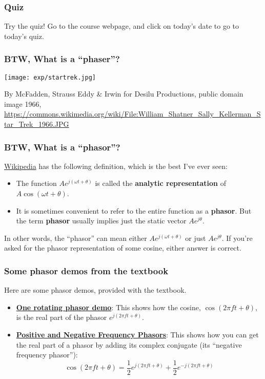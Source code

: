 \documentclass{beamer}
\begin{document}
\begin{frame}
  \frametitle{Quiz}

  Try the quiz!  Go to the course webpage, and click on today's date to go to
  today's quiz.
\end{frame}

\begin{frame}
  \frametitle{BTW, What is a ``phaser''?}
  \centerline{\texttt{[image: exp/startrek.jpg]}}
  \begin{tiny}
    By McFadden, Strauss Eddy \& Irwin for Desilu Productions, public domain image 1966,
    \url{https://commons.wikimedia.org/wiki/File:William_Shatner_Sally_Kellerman_Star_Trek_1966.JPG}
  \end{tiny}
\end{frame}

\begin{frame}
  \frametitle{BTW, What is a  ``phasor''?}

  \href{https://en.wikipedia.org/wiki/Phasor}{Wikipedia} has the following definition, which is
  the best I've ever seen:
  \begin{itemize}
    \item The function $Ae^{j(\omega t+\theta)}$ is called the {\bf
      analytic representation} of $A\cos(\omega t+\theta)$.
    \item It is sometimes convenient to refer to the entire function
      as a {\bf phasor}. But the term {\bf phasor} usually implies just the static
      vector $Ae^{j\theta}$.
  \end{itemize}
  In other words, the ``phasor'' can mean either $Ae^{j(\omega
    t+\theta)}$ or just $Ae^{j\theta}$.  If you're asked for the
  phasor representation of some cosine, either answer is correct.
\end{frame}

\begin{frame}
  \frametitle{Some phasor demos from the textbook}

  Here are some phasor demos, provided with the textbook.
  \begin{itemize}
  \item\href{http://dspfirst.gatech.edu/chapters/03spect/demos/phasors/index.html}{\bf\color{blue}One
    rotating phasor demo}: This shows how the cosine, $\cos(2\pi ft
    +\theta)$, is the real part of the phasor $e^{j(2\pi ft+\theta)}$.
  \item\href{http://dspfirst.gatech.edu/chapters/03spect/demos/phasors/index.html}{\bf\color{blue}Positive
    and Negative Frequency Phasors}: This shows how you can get the
    real part of a phasor by adding its complex conjugate (its ``negative frequency phasor''):
    \[
    \cos(2\pi ft+\theta)=\frac{1}{2}e^{j(2\pi ft+\theta)} + \frac{1}{2}e^{-j(2\pi ft+\theta)}
    \]
  \end{itemize}
\end{frame}
\end{document}
